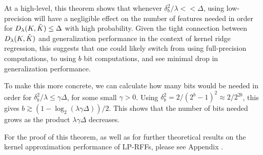 At a high-level, this theorem shows that whenever $\delta_b^2/\lambda << \Delta$, using low-precision will have a negligible effect on the number of features needed in order for $D_{\lambda}(K,\tilde{K}) \leq \Delta$ with high probability.  Given the tight connection between $D_{\lambda}(K,\tilde{K})$ and generalization performance in the context of kernel ridge regression, this suggests that one could likely switch from using full-precision computations, to using $b$ bit computations, and see minimal drop in generalization performance.

To make this more concrete, we can calculate how many bits would be needed in order for $\delta^2_b/\lambda \leq \gamma\Delta$, for some small $\gamma > 0$. Using $\delta_b^2 = 2/(2^b-1)^2 \approx 2/2^{2b}$, this gives $b \gtrsim (1-\log_2(\lambda \gamma \Delta))/2$.  This shows that the number of bits needed grows as the product $\lambda \gamma \Delta$ decreases.

For the proof of this theorem, as well as for further theoretical results on the kernel approximation performance of LP-RFFs, please see Appendix .